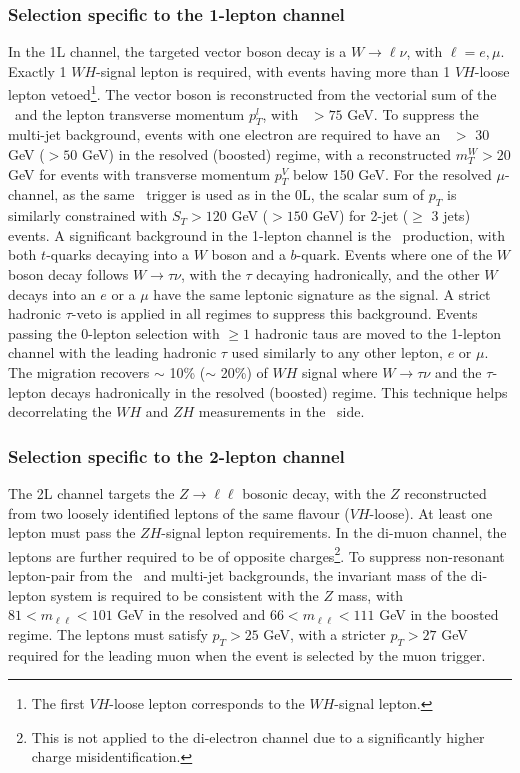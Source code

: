 \subsubsection{Selection specific to the 1-lepton channel}
In the 1L channel, the targeted vector boson decay is a $W \rightarrow \ell\nu$, with $\ell = e, \mu$. Exactly 1 $WH$-signal lepton is required, with events having more than 1 $VH$-loose lepton vetoed\footnote{The first $VH$-loose lepton corresponds to the $WH$-signal lepton.}. The vector boson is reconstructed from the vectorial sum of the \etm\ and the lepton transverse momentum $p_T^l$, with \ptv\ $> 75$ GeV. To suppress the multi-jet background, events with one electron are required to have an \etm\ $>$ 30 GeV ($> 50$ GeV) in the resolved (boosted) regime, with a reconstructed $m_T^W > 20$ GeV for events with transverse momentum $p_T^V$ below 150 GeV. For the resolved $\mu$-channel, as the same \etm\ trigger is used as in the 0L, the scalar sum of $p_T$ is similarly constrained with $S_T > 120$ GeV ($> 150$ GeV) for 2-jet ($\geq$ 3 jets) events. A significant background in the 1-lepton channel is the \ttb\ production, with both $t$-quarks decaying into a $W$ boson and a $b$-quark. Events where one of the $W$ boson decay follows $W \rightarrow \tau \nu$, with the $\tau$ decaying hadronically, and the other $W$ decays into an $e$ or a $\mu$ have the same leptonic signature as the signal. A strict hadronic $\tau$-veto is applied in all regimes to suppress this background. Events passing the 0-lepton selection with $\geq 1$ hadronic taus are moved to the 1-lepton channel with the leading hadronic $\tau$ used similarly to any other lepton, $e$ or $\mu$. The migration recovers $\sim$ 10\% ($\sim$ 20\%) of $WH$ signal where $W\rightarrow \tau \nu$ and the $\tau$-lepton decays hadronically in the resolved (boosted) regime. This technique helps decorrelating the $WH$ and $ZH$ measurements in the \vhb\ side.

\subsubsection{Selection specific to the 2-lepton channel}
The 2L channel targets the $Z \rightarrow\ell\ell$ bosonic decay, with the $Z$ reconstructed from two loosely identified leptons of the same flavour ($VH$-loose). At least one lepton must pass the $ZH$-signal lepton requirements. In the di-muon channel, the leptons are further required to be of opposite charges\footnote{This is not applied to the di-electron channel due to a significantly higher charge misidentification.}. To suppress non-resonant lepton-pair from the \ttb\ and multi-jet backgrounds, the invariant mass of the di-lepton system is required to be consistent with the $Z$ mass, with $81 < m_{\ell\ell} < 101$ GeV in the resolved and $66 < m_{\ell\ell} < 111$ GeV in the boosted regime. The leptons must satisfy $p_T > 25$ GeV, with a stricter $p_T > 27$ GeV required for the leading muon when the event is selected by the muon trigger.\\


